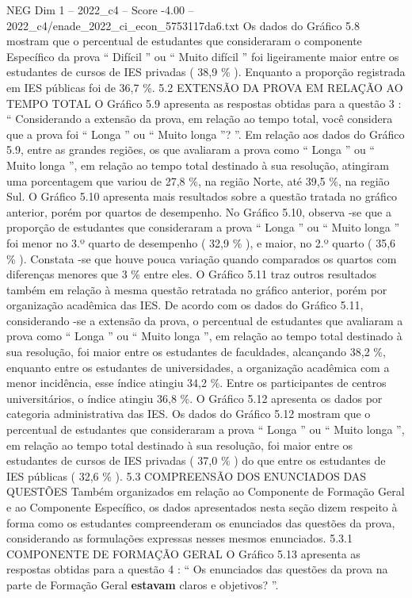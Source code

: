 \begin{textsample}{NEG Dim 1 – 2022\_c4 – Score -4.00 – 2022\_c4/enade\_2022\_ci\_econ\_5753117da6.txt}
Os dados do Gráfico 5.8 mostram que o percentual de estudantes que consideraram o componente Específico da prova “ Difícil ” ou “ Muito difícil ” foi ligeiramente maior entre os estudantes de cursos de IES privadas ( 38,9 \% ).
Enquanto a proporção registrada em IES públicas foi de 36,7 \%. 5.2 EXTENSÃO DA PROVA EM RELAÇÃO AO TEMPO TOTAL O Gráfico 5.9 apresenta as respostas obtidas para a questão 3 : “ Considerando a extensão da prova, em relação ao tempo total, você considera que a prova foi “ Longa ” ou “ Muito longa ”? ”.
Em relação aos dados do Gráfico 5.9, entre as grandes regiões, os que avaliaram a prova como “ Longa ” ou “ Muito longa ”, em relação ao tempo total destinado à sua resolução, atingiram uma porcentagem que variou de 27,8 \%, na região Norte, até 39,5 \%, na região Sul.
O Gráfico 5.10 apresenta mais resultados sobre a questão tratada no gráfico anterior, porém por quartos de desempenho.
No Gráfico 5.10, observa -se que a proporção de estudantes que consideraram a prova “ Longa ” ou “ Muito longa ” foi menor no 3.º quarto de desempenho ( 32,9 \% ), e maior, no 2.º quarto ( 35,6 \% ).
Constata -se que houve pouca variação quando comparados os quartos com diferenças menores que 3 \% entre eles.
O Gráfico 5.11 traz outros resultados também em relação à mesma questão retratada no gráfico anterior, porém por organização acadêmica das IES.
De acordo com os dados do Gráfico 5.11, considerando -se a extensão da prova, o percentual de estudantes que avaliaram a prova como “ Longa ” ou “ Muito longa ”, em relação ao tempo total destinado à sua resolução, foi maior entre os estudantes de faculdades, alcançando 38,2 \%, enquanto entre os estudantes de universidades, a organização acadêmica com a menor incidência, esse índice atingiu 34,2 \%.
Entre os participantes de centros universitários, o índice atingiu 36,8 \%.
O Gráfico 5.12 apresenta os dados por categoria administrativa das IES.
Os dados do Gráfico 5.12 mostram que o percentual de estudantes que consideraram a prova “ Longa ” ou “ Muito longa ”, em relação ao tempo total destinado à sua resolução, foi maior entre os estudantes de cursos de IES privadas ( 37,0 \% ) do que entre os estudantes de IES públicas ( 32,6 \% ). 5.3 COMPREENSÃO DOS ENUNCIADOS DAS QUESTÕES Também organizados em relação ao Componente de Formação Geral e ao Componente Específico, os dados apresentados nesta seção dizem respeito à forma como os estudantes compreenderam os enunciados das questões da prova, considerando as formulações expressas nesses mesmos enunciados. 5.3.1 COMPONENTE DE FORMAÇÃO GERAL O Gráfico 5.13 apresenta as respostas obtidas para a questão 4 : “ Os enunciados das questões da prova na parte de Formação Geral \textbf{estavam} claros e objetivos? ”.

\end{textsample}
